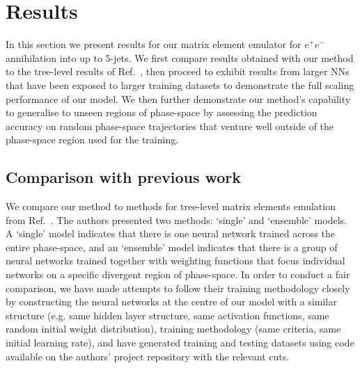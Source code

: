 \documentclass[main.tex]{subfiles}
\begin{document}
\section{Results}\label{sec:results}
In this section we present results for our matrix element emulator for $e^{+}e^{-}$ annihilation into up to 5-jets.
We first compare results obtained with our method to the tree-level results of Ref.~\cite{Badger:2020uow}, then proceed to exhibit results from larger NNs
that have been exposed to larger training datasets to demonstrate the full scaling performance of our model.
We then further demonstrate our method's capability to generalise to unseen regions of phase-space by assessing the prediction accuracy on random phase-space trajectories that venture well outside of the phase-space region used for the training.

\subsection{Comparison with previous work}\label{sec:n3jet_comparison}
We compare our method to methods for tree-level matrix elements emulation from Ref.~\cite{Badger:2020uow}.
The authors presented two methods: `single' and `ensemble' models. A `single' model indicates that there is 
one neural network trained across the entire phase-space, and an `ensemble' model indicates that there is a group of neural networks trained together
with weighting functions that focus individual networks on a specific divergent region of phase-space.
In order to conduct a fair comparison, we have made attempts to follow their training methodology closely by 
constructing the neural networks at the centre of our model with a similar structure (e.g. same hidden layer structure, same activation functions, 
same random initial weight distribution), training methodology (same {\EarlyStopping} criteria, same initial learning rate), and have generated training and testing datasets using code 
available on the authors' project repository with the relevant cuts.
\end{document}
